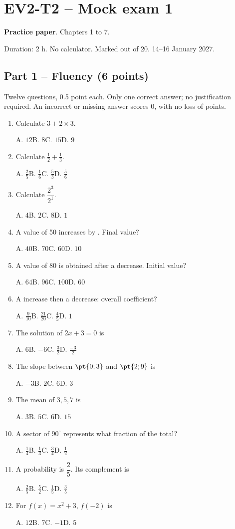 \mxnewpage\section*{EV2-T2 -- Mock exam 1}\label{EV2-T2}
\textbf{Practice paper}. Chapters 1 to 7.\par Duration: 2 h. No calculator. Marked out of 20. 14--16 January 2027.
\subsection*{Part 1 -- Fluency (6 points)}
Twelve questions, \num{0,5} point each. Only one correct answer; no justification required. An incorrect or missing answer scores 0, with no loss of points.
\begin{enumerate}
\item Calculate $3+2\times3$.\par A. $12$\quad B. $8$\quad C. $15$\quad D. $9$
\item Calculate $\frac12+\frac13$.\par A. $\frac{2}{5}$\quad B. $\frac{1}{6}$\quad C. $\frac{5}{3}$\quad D. $\frac{5}{6}$
\item Calculate $\dfrac{2^3}{2^{1}}$.\par A. $4$\quad B. $2$\quad C. $8$\quad D. $1$
\item A value of 50 increases by . Final value?\par A. $40$\quad B. $70$\quad C. $60$\quad D. $10$
\item A value of 80 is obtained after a  decrease. Initial value?\par A. $64$\quad B. $96$\quad C. $100$\quad D. $60$
\item A  increase then a  decrease: overall coefficient?\par A. $\frac{9}{10}$\quad B. $\frac{21}{20}$\quad C. $\frac{4}{5}$\quad D. $1$
\item The solution of $2x+3=0$ is\par A. $6$\quad B. $-6$\quad C. $\frac{3}{2}$\quad D. $\frac{-3}{2}$
\item The slope between $\pt{0;3}$ and $\pt{2;9}$ is\par A. $-3$\quad B. $2$\quad C. $6$\quad D. $3$
\item The mean of $3, 5, 7$ is\par A. $3$\quad B. $5$\quad C. $6$\quad D. $15$
\item A sector of $90^\circ$ represents what fraction of the total?\par A. $\frac{1}{4}$\quad B. $\frac{1}{3}$\quad C. $\frac{3}{4}$\quad D. $\frac{1}{2}$
\item A probability is $\dfrac{2}{5}$. Its complement is\par A. $\frac{2}{5}$\quad B. $\frac{5}{2}$\quad C. $\frac{1}{5}$\quad D. $\frac{3}{5}$
\item For $f(x)=x^2+3$, $f(-2)$ is\par A. $12$\quad B. $7$\quad C. $-1$\quad D. $5$
\end{enumerate}
